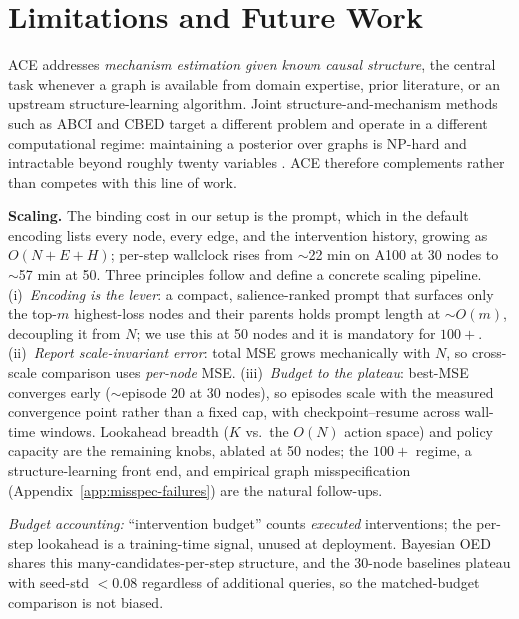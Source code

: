 \documentclass{article}
\theoremstyle{plain}
\theoremstyle{definition}
\theoremstyle{remark}
\begin{document}
\section{Limitations and Future Work}

\label{sec:limitations}
ACE addresses \emph{mechanism estimation given known causal structure}, the central task whenever a graph is available from domain expertise, prior literature, or an upstream structure-learning algorithm. Joint structure-and-mechanism methods such as ABCI and CBED target a different problem and operate in a different computational regime: maintaining a posterior over graphs is NP-hard \citep{chickering1996learning} and intractable beyond roughly twenty variables \citep{zhou2024sample}. ACE therefore complements rather than competes with this line of work.

\textbf{Scaling.} The binding cost in our setup is the prompt, which in the default encoding lists every node, every edge, and the intervention history, growing as $O(N\!+\!E\!+\!H)$; per-step wallclock rises from $\sim$22 min on A100 at 30 nodes to $\sim$57 min at 50. Three principles follow and define a concrete scaling pipeline. (i)~\emph{Encoding is the lever}: a compact, salience-ranked prompt that surfaces only the top-$m$ highest-loss nodes and their parents holds prompt length at $\sim\!O(m)$, decoupling it from $N$; we use this at 50 nodes and it is mandatory for $100+$. (ii)~\emph{Report scale-invariant error}: total MSE grows mechanically with $N$, so cross-scale comparison uses \emph{per-node} MSE. (iii)~\emph{Budget to the plateau}: best-MSE converges early ($\sim$episode 20 at 30 nodes), so episodes scale with the measured convergence point rather than a fixed cap, with checkpoint--resume across wall-time windows. Lookahead breadth ($K$ vs.\ the $O(N)$ action space) and policy capacity are the remaining knobs, ablated at 50 nodes; the $100+$ regime, a structure-learning front end, and empirical graph misspecification (Appendix~\ref{app:misspec-failures}) are the natural follow-ups.

\emph{Budget accounting:} ``intervention budget'' counts \emph{executed} interventions; the per-step lookahead is a training-time signal, unused at deployment. Bayesian OED shares this many-candidates-per-step structure, and the 30-node baselines plateau with seed-std $<\!0.08$ regardless of additional queries, so the matched-budget comparison is not biased.

\end{document}

